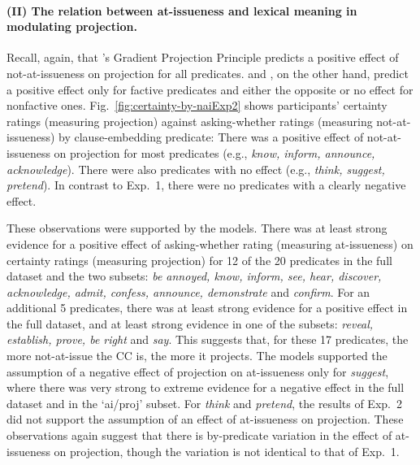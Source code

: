 \documentclass[11pt,fleqn]{article}
\newcommand{\6}{\mbox{$[\hspace*{-.6mm}[$}}
\newcommand{\9}{\mbox{$]\hspace*{-.6mm}]$}}
\newcommand{\citepos}[1]{\citeauthor{#1}'s \citeyear{#1}}
\begin{document}
\paragraph{(II) The relation between at-issueness and lexical meaning in modulating projection.}  Recall, again, that \citepos{tbd-variability} Gradient Projection Principle predicts a positive effect of not-at-issueness on projection for all predicates. \citealt{djaerv-bacovcin-salt27,djaerv-bacovcin2020} and \citealt{mahler-etal2020}, on the other hand, predict a positive effect only for factive predicates and either the opposite or no effect for nonfactive ones. Fig.~\ref{fig:certainty-by-naiExp2} shows participants' certainty ratings (measuring projection) against asking-whether ratings (measuring not-at-issueness) by clause-embedding predicate: There was a positive effect of not-at-issueness on projection for most predicates (e.g., {\em know, inform, announce, acknowledge}). There were also predicates with no effect (e.g., {\em think, suggest, pretend}). In contrast to Exp.~1, there were no predicates with a clearly negative effect. 

These observations were supported by the models. There was at least strong evidence for a positive effect of asking-whether rating (measuring at-issueness) on certainty ratings (measuring projection) for 12 of the 20 predicates in the full dataset and the two subsets: {\em be annoyed, know, inform, see, hear, discover, acknowledge, admit, confess, announce, demonstrate} and {\em confirm}. For an additional 5 predicates, there was at least strong evidence for a positive effect in the full dataset, and at least strong evidence in one of the subsets:  {\em reveal, establish, prove, be right} and {\em say}. This suggests that, for these 17 predicates, the more not-at-issue the CC is, the more it projects. The models supported the assumption of a negative effect of projection on at-issueness only for {\em suggest}, where there was very strong to extreme evidence for a negative effect in the full dataset and in the `ai/proj' subset. For {\em think} and {\em pretend}, the results of Exp.~2 did not support the assumption of an effect of at-issueness on projection. These observations again suggest that there is by-predicate variation in the effect of at-issueness on projection, though the variation is not identical to that of Exp.~1. 
\end{document}
